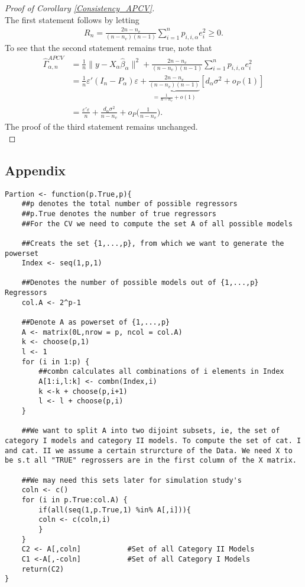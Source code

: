 \documentclass[Research_Module_ES.tex]{subfiles}
\begin{document}
\begin{proof}[Proof of Corollary \ref{Consistency_APCV}]~\\
	The first statement follows by letting 
	\begin{align*}
	R_n= \frac{2n-n_v}{(n-n_v)(n-1)}\sum_{i=1}^np_{i,i,\alpha}e_i^2\ge 0.
	\end{align*}
	To see that the second statement remains true, note that
	\begin{align*}
	\hat{\Gamma}_{\alpha,n}^{APCV} &= \frac{1}{n}\lVert y-X_\alpha\hat{\beta}_\alpha\rVert^2 +\frac{2n-n_v}{(n-n_v)(n-1)}\sum_{i=1}^np_{i,i,\alpha}e_i^2\\
	&=\frac{1}{n} \varepsilon'(I_n-P_\alpha)\varepsilon+ \underbrace{\frac{2n-n_v}{(n-n_v)(n-1)}}_{=\frac{1}{n-n_v}+o(1)}[d_\alpha\sigma^2+o_P(1)]\\
	&=\frac{\varepsilon'\varepsilon}{n} + \frac{d_\alpha\sigma^2}{n-n_v}+o_P\biggl(\frac{1}{n-n_v}\biggr).
	\end{align*}
	The proof of the third statement remains unchanged. \\
\end{proof}

\subsection*{Appendix }



\begin{lstlisting}[title={Function inorder to calculate the set of category I and II models }]
Partion <- function(p.True,p){
	##p denotes the total number of possible regressors 
	##p.True denotes the number of true regressors
	##For the CV we need to compute the set A of all possible models 
	
	##Creats the set {1,...,p}, from which we want to generate the powerset
	Index <- seq(1,p,1)                        

	##Denotes the number of possible models out of {1,...,p} Regressors 
	col.A <- 2^p-1                                           

	##Denote A as powerset of {1,...,p}
	A <- matrix(0L,nrow = p, ncol = col.A)      
	k <- choose(p,1)
	l <- 1
	for (i in 1:p) {
		##combn calculates all combinations of i elements in Index
		A[1:i,l:k] <- combn(Index,i)             
		k <-k + choose(p,i+1)
		l <- l + choose(p,i)
	}

	##We want to split A into two dijoint subsets, ie, the set of category I models and category II models. To compute the set of cat. I and cat. II we assume a certain strurcture of the Data. We need X to be s.t all "TRUE" regrossers are in the first column of the X matrix.
	
	##We may need this sets later for simulation study's
	coln <- c()
	for (i in p.True:col.A) {
		if(all(seq(1,p.True,1) %in% A[,i])){    
		coln <- c(coln,i)
		}
	}
	C2 <- A[,coln]           #Set of all Category II Models
	C1 <-A[,-coln]           #Set of all Category I Models
	return(C2)
}
\end{lstlisting}
\end{document}
